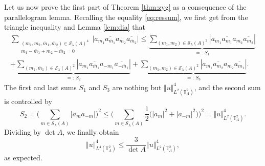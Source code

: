\documentclass[a4paper,11pt]{amsart}
\numberwithin{equation}{section}
\theoremstyle{definition}
\newcommand{\twotorus}{\mathbb T^2_A}
\begin{document}
Let us now prove the first part of Theorem \ref{thm:zyg} as a consequence of the parallelogram lemma. Recalling the equality \eqref{eq:ressum}, we first get from the triangle inequality and Lemma \ref{lem:dia} that
\begin{multline*}
    \sum_{\substack{(m_1,m_2,\overline{m}_1,\overline{m}_2) \in \mathcal S_{\lambda}(A)^4 \\[2pt] m_1 -\overline m_1+m_2 -  \overline m_2 = 0}} \vert a_{m_1} \overline{a_{\overline m_1}}a_{m_2} \overline{a_{\overline m_2}}\vert
    \le \underbrace{\sum_{(m_1, m_2) \in  \mathcal S_{\lambda}(A)^2}  |a_{m_1} \overline{a_{m_1}}  a_{m_2} \overline{a_{ m_2} }|}_{=:\, S_1} \\[5pt]
    + \underbrace{\sum_{(m_1, \overline m_1) \in \mathcal S_{\lambda}(A)^2}  |a_{m_1} \overline{a_{\overline m_1}}  a_{-m_1} \overline{a_{-\overline m_1}}|}_{=:\, S_2}
    + \underbrace{\sum_{(m_1, m_2) \in \mathcal S_{\lambda}(A)^2}  |a_{m_1} \overline{a_{m_2}}  a_{m_2} \overline{a_{m_1} }|}_{=:\, S_3}.
\end{multline*}
The first and last sums $S_1$ and $S_3$ are nothing but $\Vert u\Vert_{L^2(\twotorus)}^4$, and the second sum is controlled by
\[
    S_2 = \bigg(\sum_{m\in\mathcal S_{\lambda}(A)} |a_m a_{-m}| \bigg)^2
    \leq \bigg( \sum_{m\in\mathcal S_{\lambda}(A)} \frac 12\big(|a_m|^2 + |a_{-m}|^2\big) \bigg)^2 =  \Vert u\Vert_{L^2(\twotorus)}^4.
\]
Dividing by $\det A$, we finally obtain
\begin{equation}\label{eq:zygl4}
    \Vert u\Vert^4_{L^4(\twotorus)}\le \frac{3}{\det A}\Vert u\Vert^4_{L^2(\twotorus)},
\end{equation}
as expected.
\end{document}
